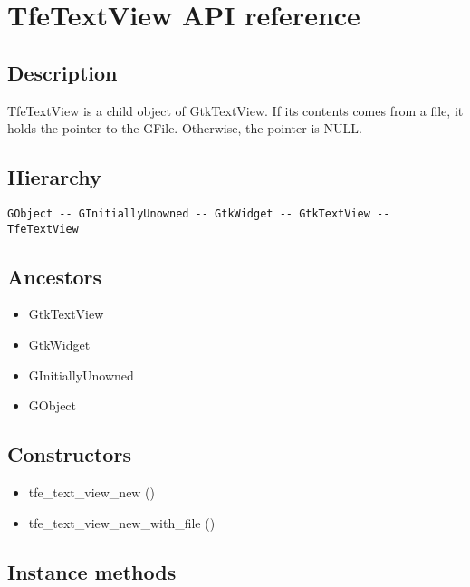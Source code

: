 \section{TfeTextView API reference}\label{tfetextview-api-reference}

\subsection{Description}\label{description}

TfeTextView is a child object of GtkTextView. If its contents comes from
a file, it holds the pointer to the GFile. Otherwise, the pointer is
NULL.

\subsection{Hierarchy}\label{hierarchy}

\begin{lstlisting}
GObject -- GInitiallyUnowned -- GtkWidget -- GtkTextView -- TfeTextView
\end{lstlisting}

\subsection{Ancestors}\label{ancestors}

\begin{itemize}
\tightlist
\item
  GtkTextView
\item
  GtkWidget
\item
  GInitiallyUnowned
\item
  GObject
\end{itemize}

\subsection{Constructors}\label{constructors}

\begin{itemize}
\tightlist
\item
  tfe\_text\_view\_new ()
\item
  tfe\_text\_view\_new\_with\_file ()
\end{itemize}

\subsection{Instance methods}\label{instance-methods}

